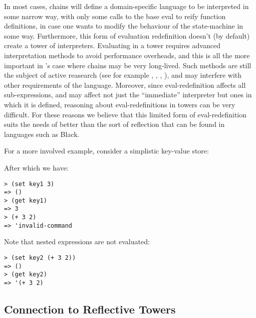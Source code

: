 In most cases, chains will define a domain-specific language to be interpreted in
some narrow way, with only some calls to the base eval to reify function
definitions, in case one wants to modify the behaviour of the state-machine in
some way. Furthermore, this form of evaluation redefinition doesn't (by default)
create a tower of interpreters. Evaluating in a tower requires advanced
interpretation methods to avoid performance overheads, and this is all
the more important in \rad{}'s case where chains may be very long-lived. Such
methods are still the subject of active reasearch (see for example \cite{Asai2014},
\cite{Thyer1999}, \cite{Amin2017}, \cite{Brown2017}), and may interfere with other
requirements of the language. Moreover, since eval-redefinition affects all
sub-expressions, and may affect not just the ``immediate'' interpreter but ones
in which it is defined, reasoning about eval-redefinitions in towers can be
very difficult.
For these reasons we believe that this limited
form of eval-redefinition suits the needs of \rad{} better than the sort of
reflection that can be found in languages such as Black.




For a more involved example, consider a simplistic key-value store:

After which we have:
\bigskip
\begin{Verbatim}
> (set key1 3)
=> ()
> (get key1)
=> 3
> (+ 3 2)
=> 'invalid-command
\end{Verbatim}
Note that nested expressions are not evaluated:
\medskip
\begin{Verbatim}
> (set key2 (+ 3 2))
=> ()
> (get key2)
=> '(+ 3 2)
\end{Verbatim}

\subsection{Connection to Reflective Towers}
\label{s:reflective-towers}

